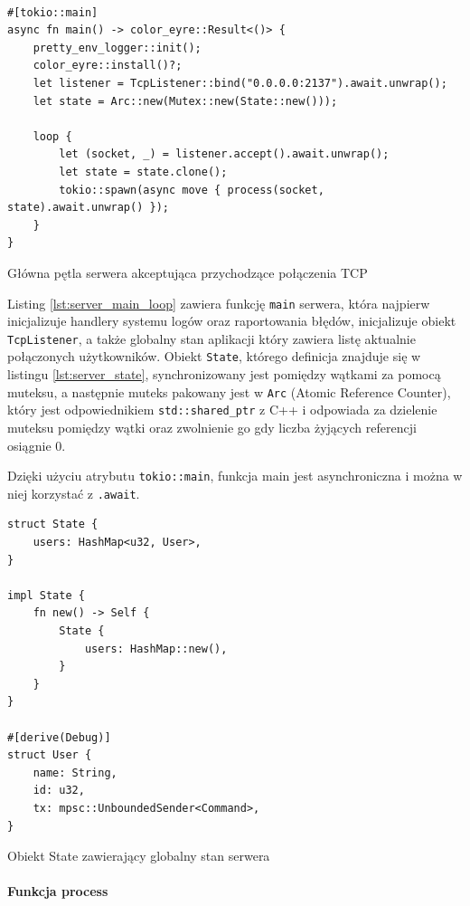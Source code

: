 \begin{listing}[H]
    \begin{verbatim}

#[tokio::main]
async fn main() -> color_eyre::Result<()> {
    pretty_env_logger::init();
    color_eyre::install()?;
    let listener = TcpListener::bind("0.0.0.0:2137").await.unwrap();
    let state = Arc::new(Mutex::new(State::new()));

    loop {
        let (socket, _) = listener.accept().await.unwrap();
        let state = state.clone();
        tokio::spawn(async move { process(socket, state).await.unwrap() });
    }
}
    \end{verbatim}
    \caption{Główna pętla serwera akceptująca przychodzące połączenia TCP}
    \label{lst:server_main_loop}
\end{listing}

Listing \ref{lst:server_main_loop} zawiera funkcję \verb|main| serwera, która najpierw inicjalizuje
handlery systemu logów oraz raportowania błędów, inicjalizuje obiekt \verb|TcpListener|, a
także globalny stan aplikacji który zawiera listę aktualnie połączonych użytkowników. Obiekt
\verb|State|, którego definicja znajduje się w listingu \ref{lst:server_state}, synchronizowany jest
pomiędzy wątkami za pomocą muteksu, a następnie muteks pakowany jest w \verb|Arc| (Atomic Reference
Counter), który jest odpowiednikiem \verb|std::shared_ptr| z C++ i odpowiada za dzielenie muteksu
pomiędzy wątki oraz zwolnienie go gdy liczba żyjących referencji osiągnie 0.

Dzięki użyciu atrybutu \verb|tokio::main|, funkcja main jest asynchroniczna i można w
niej korzystać z \verb|.await|.

\begin{listing}[H]
    \begin{verbatim}
struct State {
    users: HashMap<u32, User>,
}

impl State {
    fn new() -> Self {
        State {
            users: HashMap::new(),
        }
    }
}

#[derive(Debug)]
struct User {
    name: String,
    id: u32,
    tx: mpsc::UnboundedSender<Command>,
}
    \end{verbatim}
    \caption{Obiekt State zawierający globalny stan serwera}
    \label{lst:server_state}
\end{listing}

\paragraph{Funkcja process}

